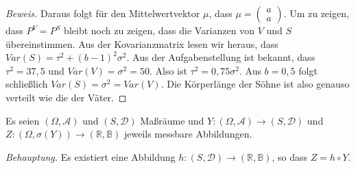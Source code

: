 \documentclass[10pt]{article}
\newcommand{\beh}{\textit{Behauptung. }}
\newenvironment{Aufgabe}[2][Aufgabe]{\begin{trivlist}
\item[\hskip \labelsep {\bfseries #1}\hskip \labelsep {\bfseries #2.}]}{\end{trivlist}}
\begin{document}
\begin{proof}[Beweis]
	Daraus folgt für den Mittelwertvektor $\mu$, dass $\mu = \begin{pmatrix} a \\ a\end{pmatrix}$. Um zu zeigen, dass
	$P^{V} = P^{S}$ bleibt noch zu zeigen, dass die Varianzen von $V$ und $S$ übereinstimmen. Aus der Kovarianzmatrix 
	lesen wir heraus, dass $Var(S) = \tau^2 + (b-1)^2\sigma^2$. Aus der Aufgabenstellung ist bekannt, dass $\tau^2 = 37,5$ 
	und $Var(V) = \sigma^2 = 50$. Also ist $\tau^2 = 0,75\sigma^2$. Aus $b=0,5$ folgt schließlich $Var(S) = \sigma^2 = 
	Var(V)$. Die Körperlänge der Söhne ist also genauso verteilt wie die der Väter.  
\end{proof}

\begin{Aufgabe}{2} %
	Es seien $(\Omega, \mathcal{A})$ und $(S, \mathcal{D})$ Maßräume und $Y:(\Omega, \mathcal{A}) \rightarrow (S, \mathcal{D})$ und $Z:(\Omega, \sigma(Y)) \rightarrow (\mathbb{R}, \mathbb{B})$ jeweils messbare Abbildungen. 
\end{Aufgabe}

\beh Es existiert eine Abbildung $h:(S, \mathcal{D}) \rightarrow  (\mathbb{R}, \mathbb{B})$, so dass $Z = h \circ Y$.
\end{document}

